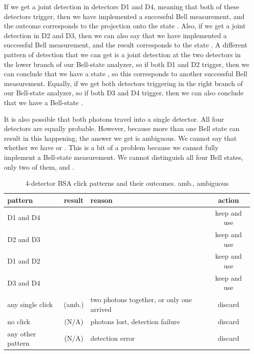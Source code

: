 If we get a joint detection in detectors D1 and D4, meaning that both of these detectors trigger, then we have implemented a successful Bell measurement, and the outcome corresponds to the projection onto the state \ket{\Psi^-}. Also, if we get a joint detection in D2 and D3, then we can also say that we have implemented a successful Bell measurement, and the result corresponds to the state \ket{\Psi^-}. A different pattern of detection that we can get is a joint detection at the two detectors in the lower branch of our Bell-state analyzer, so if both D1 and D2 trigger, then we can conclude that we have a state \ket{\Psi^+}, so this corresponds to another successful Bell measurement. Equally, if we get both detectors triggering in the right branch of our Bell-state analyzer, so if both D3 and D4 trigger, then we can also conclude that we have a Bell-state \ket{\Psi^+}.

It is also possible that both photons travel into a single detector. All four detectors are equally probable. However, because more than one Bell state can result in this happening, the answer we get is ambiguous. We cannot say that whether we have \ket{\Phi^+} or \ket{\Phi^-}.
This is a bit of a problem because we cannot fully implement a Bell-state measurement. We cannot distinguish all four Bell states, only two of them, \ket{\Psi^+} and \ket{\Psi^-}.

\begin{table}
\centering
\begin{tabular}{p{0.55in}|c|p{1.5in}|c}
pattern  & result & reason & action \\\hline
D1 and D4 & \ket{\Psi^-} & & keep and use \\
D2 and D3 & \ket{\Psi^-} & & keep and use \\
D1 and D2 & \ket{\Psi^+} & & keep and use \\
D3 and D4 & \ket{\Psi^+} & & keep and use \\
any single click & \ket{\Phi^\pm} (amb.)  & two photons together, or only one arrived & discard \\
no click & (N/A) & photons lost, detection failure & discard \\
any other pattern & (N/A) & detection error & discard
\end{tabular}
\caption{4-detector BSA click patterns and their outcomes. amb., ambiguous}
\label{tab:bsa-clicks}
\end{table}

